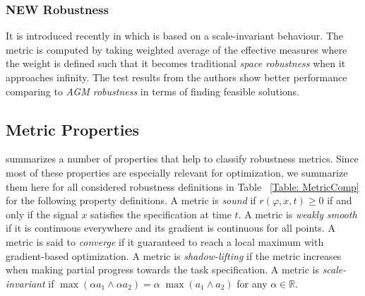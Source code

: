\documentclass[conference]{IEEEtran}
\begin{document}
\subsubsection{NEW Robustness}
It is introduced recently in \cite{varnai2020robustness} which is based on a scale-invariant behaviour.
The metric is computed by taking weighted average of the effective measures
where the weight is defined such that it becomes traditional \emph{space robustness} when it approaches infinity.
The test results from the authors show better performance comparing to \emph{AGM robustness} in terms of finding feasible solutions.

\subsection{Metric Properties} \label{Sec: Properties}

\cite{varnai2020robustness} summarizes a number of properties that help to classify robustness metrics.
Since most of these properties are especially relevant for optimization, we summarize them here for all considered robustness definitions in Table ~\ref{Table: MetricComp} for the following property definitions.
A metric is \emph{sound} if $r(\varphi, x, t) \geq 0$ if and only if the signal $x$ satisfies the specification at time $t$.
A metric is \emph{weakly smooth} if it is continuous everywhere and its gradient is continuous for all points.
A metric is said to \emph{converge} if it guaranteed to reach a local maximum with gradient-based optimization.
A metric is \emph{shadow-lifting} if the metric increases when making partial progress towards the task specification.
A metric is \emph{scale-invariant} if $\operatorname{max}(\alpha a_1\land\alpha a_2) = \alpha \; \operatorname{max}(a_1\land a_2)$ for any $\alpha \in \mathbb{R}$.

\newcommand{\no}{No}
\newcommand{\yes}{Yes}
\end{document}
